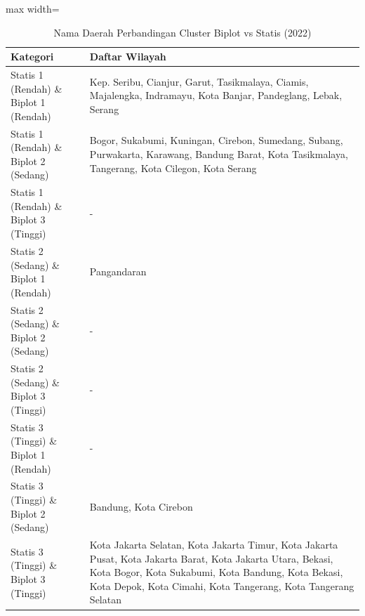 \begin{table}[H]
\centering
\caption{Nama Daerah Perbandingan Cluster Biplot vs Statis (2022)} \label{tab:appbiplot_statis_name_2022}
\begin{adjustbox}{max width=\textwidth}
\begin{tabular}{|p{4cm}|p{10cm}|}
\hline
\textbf{Kategori} & \textbf{Daftar Wilayah} \\
\hline
Statis 1 (Rendah) \& Biplot 1 (Rendah) & Kep. Seribu, Cianjur, Garut, Tasikmalaya, Ciamis, Majalengka, Indramayu, Kota Banjar, Pandeglang, Lebak, Serang \\
\hline
Statis 1 (Rendah) \& Biplot 2 (Sedang) & Bogor, Sukabumi, Kuningan, Cirebon, Sumedang, Subang, Purwakarta, Karawang, Bandung Barat, Kota Tasikmalaya, Tangerang, Kota Cilegon, Kota Serang \\
\hline
Statis 1 (Rendah) \& Biplot 3 (Tinggi) & - \\
\hline
Statis 2 (Sedang) \& Biplot 1 (Rendah) & Pangandaran \\
\hline
Statis 2 (Sedang) \& Biplot 2 (Sedang) & - \\
\hline
Statis 2 (Sedang) \& Biplot 3 (Tinggi) & - \\
\hline
Statis 3 (Tinggi) \& Biplot 1 (Rendah) & - \\
\hline
Statis 3 (Tinggi) \& Biplot 2 (Sedang) & Bandung, Kota Cirebon \\
\hline
Statis 3 (Tinggi) \& Biplot 3 (Tinggi) & Kota Jakarta Selatan, Kota Jakarta Timur, Kota Jakarta Pusat, Kota Jakarta Barat, Kota Jakarta Utara, Bekasi, Kota Bogor, Kota Sukabumi, Kota Bandung, Kota Bekasi, Kota Depok, Kota Cimahi, Kota Tangerang, Kota Tangerang Selatan \\
\hline
\end{tabular}
\end{adjustbox}
\end{table}
